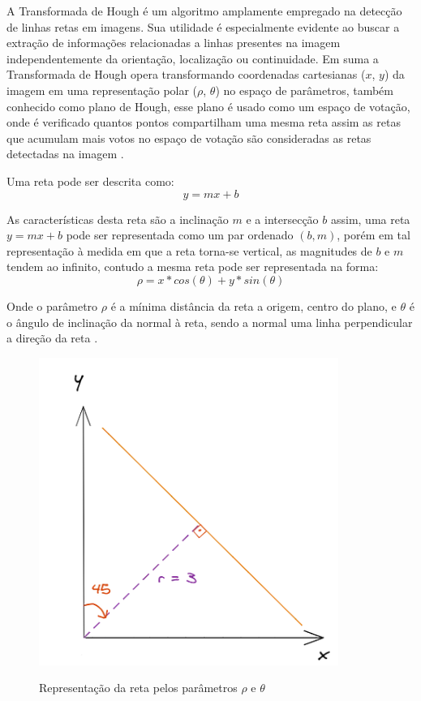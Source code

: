 A Transformada de Hough é um algoritmo amplamente empregado na detecção de linhas retas em imagens. Sua utilidade é especialmente evidente ao buscar a extração de informações relacionadas a linhas presentes na imagem independentemente da orientação, localização ou continuidade. Em suma a Transformada de Hough opera transformando coordenadas cartesianas ($x$, $y$) da imagem em uma representação polar ($\rho$, $\theta$) no espaço de parâmetros, também conhecido como plano de Hough, esse plano é usado como um espaço de votação, onde é verificado quantos pontos compartilham uma mesma reta assim as retas que acumulam mais votos no espaço de votação são consideradas as retas detectadas na imagem \cite{transformadaHough1}.


Uma reta pode ser descrita como: $$y = mx + b$$

As características desta reta são a inclinação $m$ e a intersecção $b$ assim, uma reta $y = mx + b$ pode ser representada como um par ordenado $(b, m)$, porém em tal representação à medida em que a reta torna-se vertical, as magnitudes de $b$ e $m$ tendem ao infinito, contudo a mesma reta pode ser representada na forma:  $$\rho = x*cos(\theta)+y*sin(\theta)$$

Onde o parâmetro $\rho$ é a mínima distância da reta a origem, centro do plano, e $\theta$ é o ângulo de inclinação da normal à reta, sendo a normal uma linha perpendicular a direção da reta \cite{detectBar}.

\begin{figure}[H]
	\centering
    \caption{Representação da reta pelos parâmetros $\rho$ e $\theta$}
	\includegraphics[scale=2]{figuras/math/rhotheta.png}
    \label{fig:Representacao da reta pelos parametros}
\end{figure}

